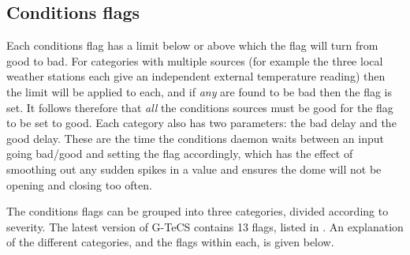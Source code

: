 \subsection{Conditions flags}
\label{sec:conditions_flags}
\begin{colsection}

Each conditions flag has a limit below or above which the flag will turn from good to bad. For categories with multiple sources (for example the three local weather stations each give an independent external temperature reading) then the limit will be applied to each, and if \textit{any} are found to be bad then the flag is set. It follows therefore that \textit{all} the conditions sources must be good for the flag to be set to good. Each category also has two parameters: the bad delay and the good delay. These are the time the conditions daemon waits between an input going bad/good and setting the flag accordingly, which has the effect of smoothing out any sudden spikes in a value and ensures the dome will not be opening and closing too often.

The conditions flags can be grouped into three categories, divided according to severity. The latest version of G-TeCS contains 13 flags, listed in . An explanation of the different categories, and the flags within each, is given below.


\end{colsection}
